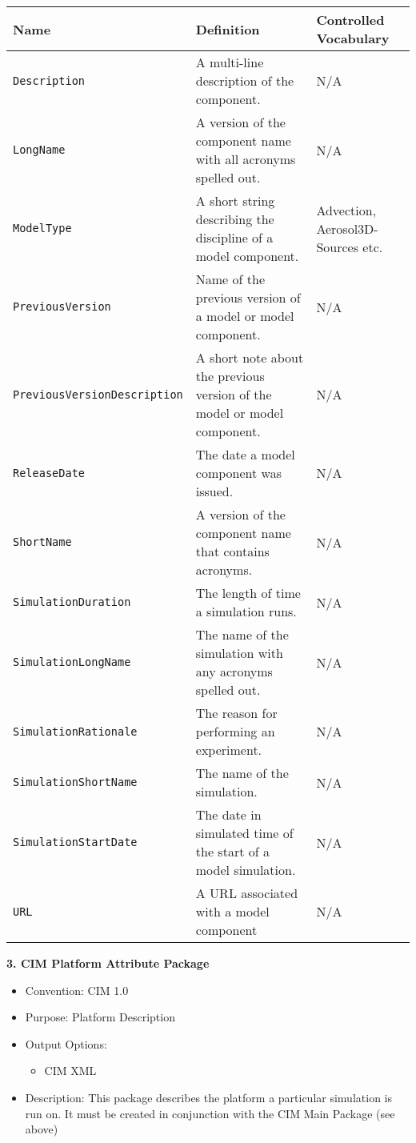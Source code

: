 \begin{tabular}{|p{8cm}|p{20cm}|p{10cm}}
     {\bf Name} & {\bf Definition} & {\bf Controlled Vocabulary}\\
     \hline\hline
     {\tt Description} & A multi-line description of the component. & N/A \\
     {\tt LongName} & A version of the component name with all acronyms spelled out. & N/A\\
     {\tt ModelType} & A short string describing the discipline of a model component. & Advection, Aerosol3D-Sources etc.\\
     {\tt PreviousVersion} & Name of the previous version of a model or model component. & N/A\\ 
     {\tt PreviousVersionDescription} &  A short note about the previous version of the model or model component. & N/A \\ 
     {\tt ReleaseDate} & The date a model component was issued. & N/A \\
     {\tt ShortName} & A version of the component name that contains acronyms. & N/A \\
     {\tt SimulationDuration} & The length of time a simulation runs. & N/A \\
     {\tt SimulationLongName} & The name of the simulation with any acronyms spelled out. & N/A \\ 
     {\tt SimulationRationale} & The reason for performing an experiment. & N/A\\
     {\tt SimulationShortName} & The name of the simulation. & N/A \\
     {\tt SimulationStartDate} & The date in simulated time of the start of a model simulation. & N/A\\ 
     {\tt URL} & A URL associated with a model component & N/A \\
\end{tabular}

\vspace{.20in}


{\bf 3. CIM Platform Attribute Package}

\begin{itemize}
    \item Convention: CIM 1.0
    \item Purpose: Platform Description
    \item Output Options:
    \begin{itemize}
       \item CIM XML 
    \end{itemize} 
    \item Description: This package describes the platform a particular simulation is run on. It must be created in conjunction with the CIM Main Package (see above) 
\end{itemize}


